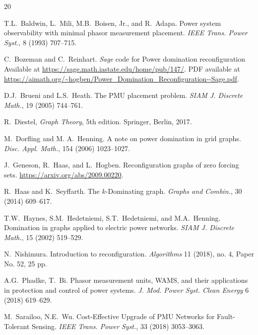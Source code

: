 \documentclass{article}
\numberwithin{figure}{section}   %
\theoremstyle{definition}
\theoremstyle{definition}
\theoremstyle{definition}
\begin{document}
\begin{thebibliography}{20}


 T.L.~Baldwin, L.~Mili, M.B.~Boisen, Jr., and R.~Adapa. Power system observability with minimal phasor measurement placement. {\em IEEE Trans. Power Syst.}, 8 (1993) 707--715.

 C.~Bozeman and C.~Reinhart. {\em Sage} code for Power domination reconfiguration 
Available   at \url{https://sage.math.iastate.edu/home/pub/147/}.  PDF available at \url{https://aimath.org/~hogben/Power_Domination_Reconfiguration--Sage.pdf}. 

 D.J.~Brueni and L.S.~Heath. The PMU placement problem. {\em SIAM J. Discrete Math.}, 19 (2005) 744--761. 

  R.~Diestel, {\em Graph Theory}, 5th edition. Springer, Berlin, 2017.


 M.~Dorfling and M. A.~Henning. A note on power domination in grid graphs. \emph{Disc. Appl. Math.}, 154 (2006) 1023--1027.

 J.~Geneson, R.~Haas, and L.~Hogben. Reconfiguration graphs of   zero forcing sets.  \url{https://arxiv.org/abs/2009.00220}.

 R.~Haas and K.~Seyffarth. The $k$-Dominating graph. \emph{Graphs and Combin.}, 30 (2014) 609--617. 

  T.W.~Haynes, S.M.~Hedetniemi, S.T.~Hedetniemi, and M.A.~Henning. Domination in graphs applied to electric power networks. {\em SIAM J. Discrete Math.}, 15 (2002) 519--529.

 N.~Nishimura. Introduction to reconfiguration. {\em Algorithms} 11 (2018), no. 4, Paper No. 52, 25 pp.


 A.G.~Phadke, T.~Bi. Phasor measurement units, WAMS, and their applications in protection and control of power systems. {\em J. Mod. Power Syst. Clean Energy} 6 (2018) 619--629.

  M.~Sarailoo, N.E.~Wu. Cost-Effective Upgrade of PMU Networks for Fault- Tolerant Sensing. {\em IEEE Trans. Power Syst.}, 33 (2018) 3053--3063.
\end{thebibliography}


\end{document}
